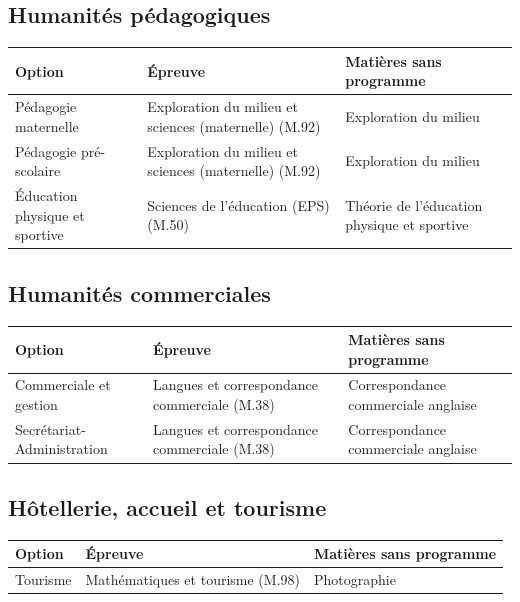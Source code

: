 \documentclass[11pt,a4paper]{article}
\begin{document}
\subsection{Humanités pédagogiques}
\begin{longtable}{@{}>{\raggedright\arraybackslash}p{3.4cm}>{\raggedright\arraybackslash}p{4.4cm}>{\raggedright\arraybackslash}p{7.4cm}@{}}
\toprule
\textbf{Option} & \textbf{Épreuve} & \textbf{Matières sans programme}\\
\midrule\endhead
Pédagogie maternelle & Exploration du milieu et sciences (maternelle) (M.92) & Exploration du milieu\\
Pédagogie pré-scolaire & Exploration du milieu et sciences (maternelle) (M.92) & Exploration du milieu\\
Éducation physique et sportive & Sciences de l'éducation (EPS) (M.50) & Théorie de l'éducation physique et sportive\\
\bottomrule
\end{longtable}

\subsection{Humanités commerciales}
\begin{longtable}{@{}>{\raggedright\arraybackslash}p{3.4cm}>{\raggedright\arraybackslash}p{4.4cm}>{\raggedright\arraybackslash}p{7.4cm}@{}}
\toprule
\textbf{Option} & \textbf{Épreuve} & \textbf{Matières sans programme}\\
\midrule\endhead
Commerciale et gestion & Langues et correspondance commerciale (M.38) & Correspondance commerciale anglaise\\
Secrétariat-Administration & Langues et correspondance commerciale (M.38) & Correspondance commerciale anglaise\\
\bottomrule
\end{longtable}

\subsection{Hôtellerie, accueil et tourisme}
\begin{longtable}{@{}>{\raggedright\arraybackslash}p{3.4cm}>{\raggedright\arraybackslash}p{4.4cm}>{\raggedright\arraybackslash}p{7.4cm}@{}}
\toprule
\textbf{Option} & \textbf{Épreuve} & \textbf{Matières sans programme}\\
\midrule\endhead
Tourisme & Mathématiques et tourisme (M.98) & Photographie\\
\bottomrule
\end{longtable}
\end{document}
